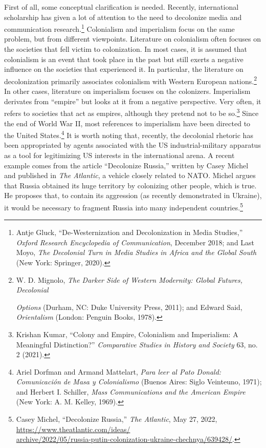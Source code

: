 \documentclass{tufte-handout}
\begin{document}
First of all, some conceptual clarification is needed. Recently,
international scholarship has given a lot of attention to the need to
decolonize media and communication research.\footnote{Antje Gluck,
  ``De-Westernization and Decolonization in Media Studies,''
  \emph{Oxford Research Encyclopedia of Communication}, December 2018;
  and Last Moyo, \emph{The Decolonial Turn in Media Studies in Africa
  and the Global South} (New York: Springer, 2020).} Colonialism and
imperialism focus on the same problem, but from different viewpoints.
Literature on colonialism often focuses on the societies that fell
victim to colonization. In most cases, it is assumed that colonialism is
an event that took place in the past but still exerts a negative
influence on the societies that experienced it. In particular, the
literature on decolonization primarily associates colonialism with
Western European nations.\footnote{W. D. Mignolo, \emph{The Darker Side
  of Western Modernity: Global Futures, Decolonial}

  \emph{Options} (Durham, NC: Duke University Press, 2011); and Edward
  Said, \emph{Orientalism} (London: Penguin Books, 1978).} In other
cases, literature on imperialism focuses on the colonizers. Imperialism
derivates from ``empire'' but looks at it from a negative perspective.
Very often, it refers to societies that act as empires, although they
pretend not to be so.\footnote{Krishan Kumar, ``Colony and Empire,
  Colonialism and Imperialism: A Meaningful Distinction?''
  \emph{Comparative Studies in History and Society} 63, no. 2 (2021).}
Since the end of World War II, most references to imperialism have been
directed to the United States.\footnote{Ariel Dorfman and Armand
  Mattelart, \emph{Para leer al Pato Donald: Comunicación de Masa y
  Colonialismo} (Buenos Aires: Siglo Veinteuno, 1971); and Herbert I.
  Schiller, \emph{Mass Communications and the American Empire} (New
  York: A. M. Kelley, 1969).} It is worth noting that, recently, the
decolonial rhetoric has been appropriated by agents associated with the
US industrial-military apparatus as a tool for legitimizing US interests
in the international arena. A recent example comes from the article
``Decolonize Russia,'' written by Casey Michel and published in
\emph{The Atlantic}, a vehicle closely related to NATO. Michel argues
that Russia obtained its huge territory by colonizing other people,
which is true. He proposes that, to contain its aggression (as recently
demonstrated in Ukraine), it would be necessary to fragment Russia into
many independent countries.\footnote{Casey Michel, ``Decolonize
  Russia,'' \emph{The Atlantic}, May 27, 2022,
  \href{https://www.theatlantic.com/ideas/archive/2022/05/russia-putin-colonization-ukraine-chechnya/639428/.}{https://www.theatlantic.com/ideas/\\\noindent archive/2022/05/russia-putin-colonization-ukraine-chechnya/639428/}.}
\end{document}
